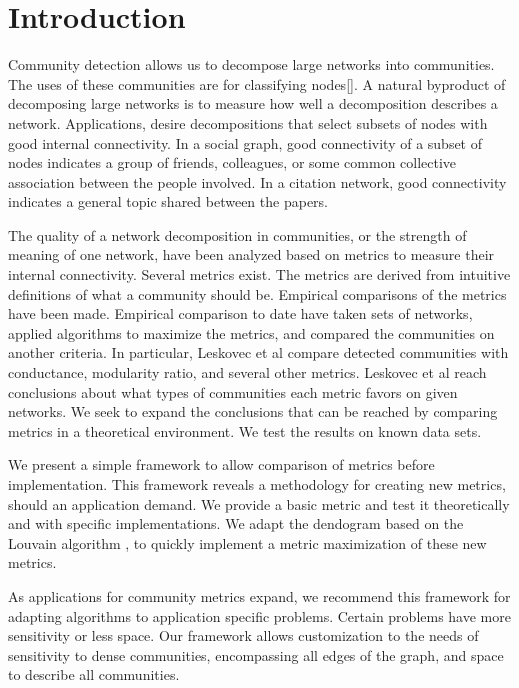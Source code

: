 \documentclass[conference]{IEEEtran}
\begin{document}
\section{Introduction}

Community detection allows us to decompose large networks into communities.  The uses of these communities are for classifying nodes[].  A natural byproduct of decomposing large networks is to measure how well a decomposition describes a network.  Applications, desire decompositions that select subsets of nodes with good internal connectivity.  In a social graph, good connectivity of a subset of nodes indicates a group of friends, colleagues, or some common collective association between the people involved.  In a citation network, good connectivity indicates a general topic shared between the papers. 

The quality of a network decomposition in communities, or the strength of meaning of one network, have been analyzed based on metrics to measure their internal connectivity.  Several metrics exist.  The metrics are derived from intuitive definitions of what a community should be.  Empirical comparisons of the metrics have been made.  Empirical comparison to date have taken sets of networks, applied algorithms to maximize the metrics, and compared the communities on another criteria.  In particular, Leskovec et al\cite{leskovec:empirical} compare detected communities with conductance, modularity ratio, and several other metrics.  Leskovec et al reach conclusions about what types of communities each metric favors on given networks.  We seek to expand the conclusions that can be reached by comparing metrics in a theoretical environment.  We test the results on known data sets.


We present a simple framework to allow comparison of metrics before implementation.  This framework reveals a methodology for creating new metrics, should an application demand.  We provide a basic metric and test it theoretically and with specific implementations.  We adapt the dendogram based on the Louvain algorithm \cite{louvain}, to quickly implement a metric maximization of these new metrics.

As applications for community metrics expand, we recommend this framework for adapting algorithms to application specific problems.  Certain problems have more sensitivity or less space.  Our framework allows customization to the needs of sensitivity to dense communities, encompassing all edges of the graph, and space to describe all communities.
\end{document}
